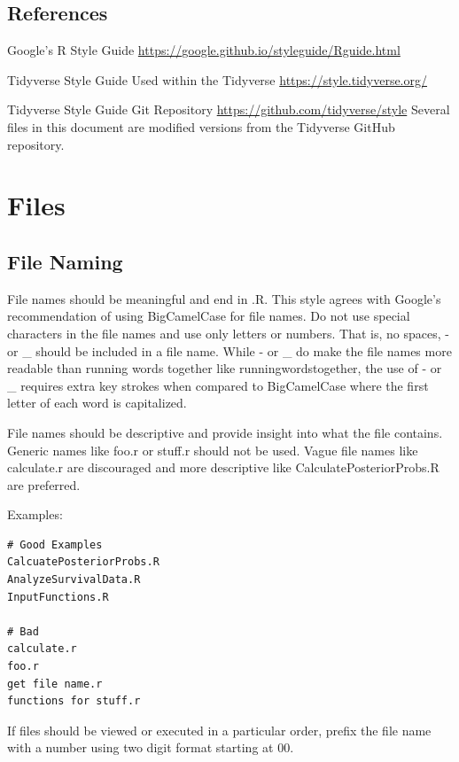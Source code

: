 \documentclass[
]{book}
\begin{document}
\hypertarget{references}{%
\section{References}\label{references}}

Google's R Style Guide
\url{https://google.github.io/styleguide/Rguide.html}

Tidyverse Style Guide
Used within the Tidyverse
\url{https://style.tidyverse.org/}

Tidyverse Style Guide Git Repository \url{https://github.com/tidyverse/style}
Several files in this document are modified versions from the Tidyverse GitHub repository.

\hypertarget{files}{%
\chapter{Files}\label{files}}

\hypertarget{file-naming}{%
\section{File Naming}\label{file-naming}}

File names should be meaningful and end in .R. This style agrees with Google's recommendation of using BigCamelCase for file names. Do not use special characters in the file names and use only letters or numbers. That is, no spaces, - or \_ should be included in a file name. While - or \_ do make the file names more readable than running words together like runningwordstogether, the use of - or \_ requires extra key strokes when compared to BigCamelCase where the first letter of each word is capitalized.

File names should be descriptive and provide insight into what the file contains. Generic names like foo.r or stuff.r should not be used. Vague file names like calculate.r are discouraged and more descriptive like CalculatePosteriorProbs.R are preferred.

Examples:

\begin{verbatim}
# Good Examples
CalcuatePosteriorProbs.R
AnalyzeSurvivalData.R 
InputFunctions.R

# Bad 
calculate.r
foo.r
get file name.r
functions for stuff.r 
\end{verbatim}

If files should be viewed or executed in a particular order, prefix the file name with a number using two digit format starting at 00.
\end{document}
